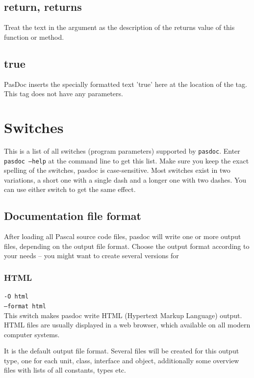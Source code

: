 \documentclass[11pt]{article}
\begin{document}
\subsection{return, returns}

Treat the text in the argument as the description of the returns
value of this function or method.

\subsection{true}

PasDoc inserts the specially formatted text 'true' here
at the location of the tag. This tag does not have any
parameters.

\section{Switches}

This is a list of all switches (program parameters) supported by {\tt pasdoc}.
Enter {\tt pasdoc --help} at the command line to get this list.
Make sure you keep the exact spelling of the switches, pasdoc is case-sensitive.
Most switches exist in two variations, a short one with a single dash and
a longer one with two dashes.
You can use either switch to get the same effect.

\subsection{Documentation file format}

After loading all Pascal source code files, pasdoc will write one or more
output files, depending on the output file format.
Choose the output format according to your needs -- you might want to create
several versions for

\subsubsection{HTML}

{\tt -O html}\\
{\tt --format html}\\

This switch makes pasdoc write HTML (Hypertext Markup Language) output.
HTML files are usually displayed in a web browser, which available on
all modern computer systems.

It is the default output file format. Several files will be created for
this output type, one for each unit, class, interface and object,
additionally some overview files with lists of all constants, types etc.
\end{document}
